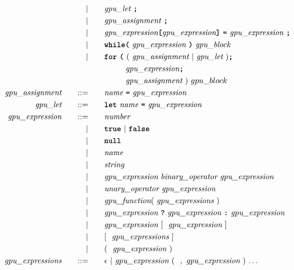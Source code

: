 \begin{alignat*}{9}
    &&  && |    &\quad &&  \textit{gpu\_let} \ \textbf{\texttt{;}} \\
    &&  && |    &\quad &&  \textit{gpu\_assignment} \ \textbf{\texttt{;}} \\
    &&  && |    &\quad &&  \textit{gpu\_expression} \textbf{\texttt{[}} \textit{gpu\_expression} \textbf{\texttt{]}}\ \textbf{\texttt{=}}\  \textit{gpu\_expression} \ \textbf{\texttt{;}} \\
    &&  && |    &\quad &&  \textbf{\texttt{while}} \textbf{\texttt{(}}\  \textit{gpu\_expression} \ \textbf{\texttt{)}} \ \textit{gpu\_block} \\
    &&  && |    &\quad &&  \textbf{\texttt{for}}\ \textbf{\texttt{(}} 
                              \  ( \ \textit{gpu\_assignment} \ | \ \textit{gpu\_let} \ )\textbf{\texttt{;}} \\
    &&  &&     &\quad && \ \ \ \ \ \ \ \  \textit{gpu\_expression} \textbf{\texttt{;}} \\
    &&  &&     &\quad && \ \ \ \ \ \ \ \  \textit{gpu\_assignment} \ ) \ gpu\_block \\
    && \textit{gpu\_assignment} 
    &&\quad ::= &\quad 
    && \textit{name} \ \textbf{\texttt{=}}\  \textit{gpu\_expression} \\
    && \textit{gpu\_let} 
    &&\quad ::= &\quad 
    && \textbf{\texttt{let}} \ \textit{name} \ \textbf{\texttt{=}}\  \textit{gpu\_expression} \\
    && \textit{gpu\_expression} 
    &&\quad ::= &\quad 
    && \textit{number} \\
    &&  && |    &\quad &&  \textbf{\texttt{true}} \ | \ \textbf{\texttt{false}} \\
    &&  && |    &\quad &&  \textbf{\texttt{null}} \\
    &&  && |    &\quad &&  \textit{name}\\
    &&  && |    &\quad &&  \textit{string}\\
    &&  && |    &\quad &&  \textit{gpu\_expression} \ \textit{binary\_operator} \ \textit{gpu\_expression} \\
    &&  && |    &\quad &&  \textit{unary\_operator} \ \textit{gpu\_expression} \\
    &&  && |    &\quad &&  \textit{gpu\_function} ( \  \textit{gpu\_expressions} \ ) \\
    &&  && |    &\quad &&  \textit{gpu\_expression} \ \textbf{\texttt{?}} \ \textit{gpu\_expression} \ \textbf{\texttt{:}} \ \textit{gpu\_expression} \\
    &&  && |    &\quad &&  \textit{gpu\_expression} \ [ \ \ \textit{gpu\_expression} \ ] \ \\
    &&  && |    &\quad && [ \ \ \textit{gpu\_expressions} \ ] \ \\
    &&  && |    &\quad && ( \ \ \textit{gpu\_expression} \ ) \ \\
    && \textit{gpu\_expressions} 
    &&\quad ::= &\quad 
    && \epsilon \ | \ \textit{gpu\_expression} \ ( \ \ , \ \textit{gpu\_expression} \ )
    \ {\ldots}
    \end{alignat*}